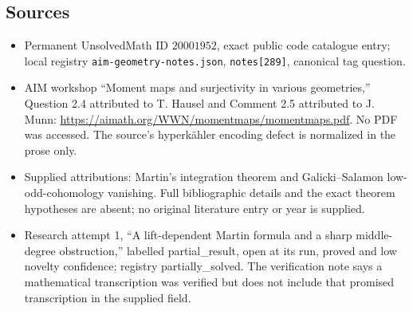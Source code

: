 \documentclass[11pt]{article}
\begin{document}
\subsection{Sources}
\begin{itemize}
\item Permanent UnsolvedMath ID \(20001952\), exact public code catalogue entry; local registry \texttt{aim-geometry-notes.json}, \texttt{notes[289]}, canonical tag question.
\item AIM workshop ``Moment maps and surjectivity in various geometries,'' Question 2.4 attributed to T. Hausel and Comment 2.5 attributed to J. Munn: \url{https://aimath.org/WWN/momentmaps/momentmaps.pdf}. No PDF was accessed. The source's hyperkähler encoding defect is normalized in the prose only.
\item Supplied attributions: Martin's integration theorem and Galicki--Salamon low-odd-cohomology vanishing. Full bibliographic details and the exact theorem hypotheses are absent; no original literature entry or year is supplied.
\item Research attempt 1, ``A lift-dependent Martin formula and a sharp middle-degree obstruction,'' labelled partial\_result, open at its run, proved and low novelty confidence; registry partially\_solved. The verification note says a mathematical transcription was verified but does not include that promised transcription in the supplied field.
\end{itemize}
\end{document}

